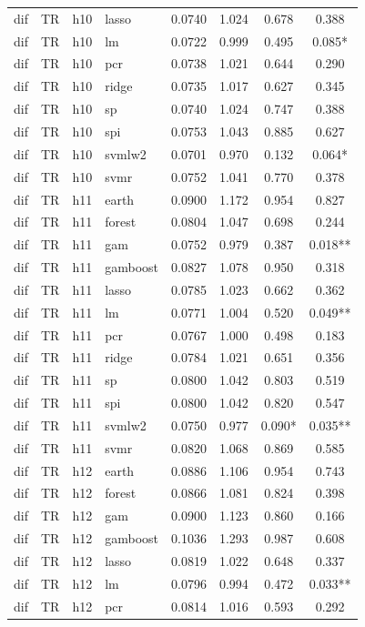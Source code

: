 \begin{ThreePartTable}
\begin{longtable}[t]{llclcccc}
dif & TR & h10 & lasso & 0.0740 & 1.024 & 0.678 & 0.388\\
dif & TR & h10 & lm & 0.0722 & 0.999 & 0.495 & 0.085*\\
dif & TR & h10 & pcr & 0.0738 & 1.021 & 0.644 & 0.290\\
dif & TR & h10 & ridge & 0.0735 & 1.017 & 0.627 & 0.345\\
dif & TR & h10 & sp & 0.0740 & 1.024 & 0.747 & 0.388\\
dif & TR & h10 & spi & 0.0753 & 1.043 & 0.885 & 0.627\\
dif & TR & h10 & svmlw2 & 0.0701 & 0.970 & 0.132 & 0.064*\\
dif & TR & h10 & svmr & 0.0752 & 1.041 & 0.770 & 0.378\\
\addlinespace
dif & TR & h11 & earth & 0.0900 & 1.172 & 0.954 & 0.827\\
dif & TR & h11 & forest & 0.0804 & 1.047 & 0.698 & 0.244\\
dif & TR & h11 & gam & 0.0752 & 0.979 & 0.387 & 0.018**\\
dif & TR & h11 & gamboost & 0.0827 & 1.078 & 0.950 & 0.318\\
dif & TR & h11 & lasso & 0.0785 & 1.023 & 0.662 & 0.362\\
dif & TR & h11 & lm & 0.0771 & 1.004 & 0.520 & 0.049**\\
dif & TR & h11 & pcr & 0.0767 & 1.000 & 0.498 & 0.183\\
dif & TR & h11 & ridge & 0.0784 & 1.021 & 0.651 & 0.356\\
dif & TR & h11 & sp & 0.0800 & 1.042 & 0.803 & 0.519\\
dif & TR & h11 & spi & 0.0800 & 1.042 & 0.820 & 0.547\\
dif & TR & h11 & svmlw2 & 0.0750 & 0.977 & 0.090* & 0.035**\\
dif & TR & h11 & svmr & 0.0820 & 1.068 & 0.869 & 0.585\\
\addlinespace
dif & TR & h12 & earth & 0.0886 & 1.106 & 0.954 & 0.743\\
dif & TR & h12 & forest & 0.0866 & 1.081 & 0.824 & 0.398\\
dif & TR & h12 & gam & 0.0900 & 1.123 & 0.860 & 0.166\\
dif & TR & h12 & gamboost & 0.1036 & 1.293 & 0.987 & 0.608\\
dif & TR & h12 & lasso & 0.0819 & 1.022 & 0.648 & 0.337\\
dif & TR & h12 & lm & 0.0796 & 0.994 & 0.472 & 0.033**\\
dif & TR & h12 & pcr & 0.0814 & 1.016 & 0.593 & 0.292\\

\end{longtable}
\end{ThreePartTable}
